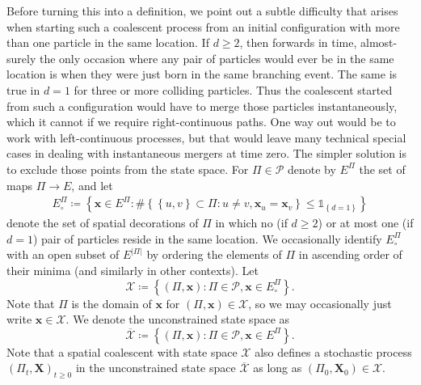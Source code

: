 \documentclass[reqno,draft]{amsart}
\numberwithin{equation}{section}
\theoremstyle{plain}
\theoremstyle{remark}
\newcommand{\ind}{\mathds{1}}
\newcommand{\fpart}{\Pi} %
\begin{document}
Before turning this into a definition, we point out a subtle difficulty that arises when starting such a coalescent process from an initial configuration with more than one particle in the same location. If $d \ge 2$, then forwards in time, almost-surely the only occasion where any pair of particles would ever be in the same location is when they were just born in the same branching event. The same is true in $d = 1$ for three or more colliding particles. Thus the coalescent started from such a configuration would have to merge those particles instantaneously, which it cannot if we require right-continuous paths.
One way out would be to work with left-continuous processes, but that would leave many technical special cases in dealing with instantaneous mergers at time zero. The simpler solution is to exclude those points from the state space. %
For $\fpart \in \mathcal{P}$ denote by $E^\fpart$ the set of maps $\fpart \to E$, and let
\begin{align}\label{eq:def:Ecirc}
    E^\fpart_\circ \coloneqq \left\{ \boldsymbol x\in E^\fpart\colon \#\!\left\{ \left\{ u,v \right\} \subset \fpart\colon u\neq v, \boldsymbol x_u = \boldsymbol x_v \right\} \le \ind_{\left\{ d = 1 \right\} } \right\}
\end{align}
denote the set of spatial decorations of $\fpart$ in which no (if $d\ge 2$) or at most one (if $d = 1$) pair of particles reside in the same location. We occasionally identify $E_\circ ^{\fpart}$ with an open subset of $E^{|\fpart|}$ by ordering the elements of $\fpart$ in ascending order of their minima (and similarly in other contexts). %
Let
\begin{equation}\label{eq:defX}
    \mathcal{X}\coloneqq \left\{ (\fpart,\boldsymbol x)\colon \fpart \in \mathcal{P}, \boldsymbol x\in E^\fpart_\circ  \right\}.
\end{equation}
Note that $\fpart$ is the domain of $\boldsymbol x$ for $(\fpart,\boldsymbol x) \in \mathcal{X}$, so we may occasionally just write $\boldsymbol x\in \mathcal{X}$. We denote the unconstrained state space as
\begin{equation}\label{eq:defXbar}
    \overline{\mathcal{X}} \coloneqq \left\{ (\fpart, \boldsymbol x)\colon \fpart \in \mathcal{P}, \boldsymbol x \in E^\fpart \right\} .
\end{equation}
Note that a spatial coalescent with state space $\mathcal{X}$ also defines a stochastic process $(\fpart_t,\boldsymbol X)_{t\ge 0}$ in the unconstrained state space $\overline{\mathcal{X}}$ as long as $(\fpart_0,\boldsymbol X_0)\in \mathcal{X}$.  %
\end{document}
